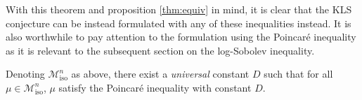 With this theorem and proposition \ref{thm:equiv} in mind, it is clear that the KLS conjecture can be 
instead formulated with any of these inequalities instead. It is also worthwhile to pay attention to the 
formulation using the Poincaré inequality as it is relevant to the subsequent section on the log-Sobolev 
inequality.

\begin{conjecture}
  Denoting \(\mathscr{M}^n_{\text{iso}}\) as above, there exist a \textit{universal} constant \(D\) 
  such that for all \(\mu \in \mathscr{M}^n_{\text{iso}}\), \(\mu\) satisfy the Poincaré inequality 
  with constant \(D\).
\end{conjecture}


